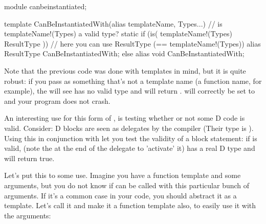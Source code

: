 \begin{dcode}
module canbeinstantiated;

template CanBeInstantiatedWith(alias templateName, Types...)
{
    // is templateName!(Types) a valid type?
    static if (is( templateName!(Types) ResultType ))
    // here you can use ResultType (== templateName!(Types))
        alias ResultType CanBeInstantiatedWith;
    else
        alias void       CanBeInstantiatedWith;
}
\end{dcode}

Note that the previous code was done with templates in mind, but it is quite robust: if you pass as  something that's not a template name (a func\-tion name, for ex\-am\-ple), the  will see  has no valid type and will return .   will cor\-rec\-tly be set to  and your program does not crash.


An interesting use for this form of , is testing whether or not some D code is valid. Consider: D blocks are seen as delegates by the compiler (Their type is \DD{()}). Using this in conjunction with  let you test the validity of a block statement: if  is valid,  (note the \DD{()} at the end of the delegate to 'activate' it) has a real D type and  will return true.

Let's put this to some use. Imagine you have a function template  and some arguments, but you do not know if  can be called with this particular bunch of arguments. If it's a common case in your code, you should abstract it as a template. Let's call it  and make it a function template also, to easily use it with the arguments:

